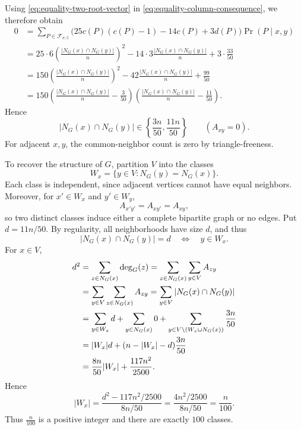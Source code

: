 Using \eqref{eq:equality-two-root-vector} in
\eqref{eq:equality-column-consequence}, we therefore obtain
\begin{align*}
0&=\sum_{P\in\mathcal F_{\sigma,5}}
\big(25c(P)(c(P)-1)-14c(P)+3d(P)\big)\Pr(P\mid x,y)\\
&=25\cdot6\left(\frac{|N_G(x)\cap N_G(y)|}{n}\right)^2-14\cdot3\frac{|N_G(x)\cap N_G(y)|}{n}+3\cdot\frac{33}{50}\\
 &=150\left(\frac{|N_G(x)\cap N_G(y)|}{n}\right)^2-42\frac{|N_G(x)\cap N_G(y)|}{n}+\frac{99}{50}\\
 &=150\left(\frac{|N_G(x)\cap N_G(y)|}{n}-\frac3{50}\right)
       \left(\frac{|N_G(x)\cap N_G(y)|}{n}-\frac{11}{50}\right).
\end{align*}
\endgroup
Hence
\begin{equation}\label{eq:equality-common-neighbors}
|N_G(x)\cap N_G(y)|\in
\left\{\frac{3n}{50},\frac{11n}{50}\right\}
\qquad(A_{xy}=0).
\end{equation}
For adjacent $x,y$, the common-neighbor count is zero by
triangle-freeness.

To recover the structure of $G$, partition $V$ into the classes
\[
W_x=\{y\in V:N_G(y)=N_G(x)\}.
\]
Each class is independent, since adjacent vertices cannot have equal
neighbors.
Moreover, for $x'\in W_x$ and $y'\in W_y$,
\[
A_{x'y'}=A_{xy'}=A_{xy},
\]
so two distinct classes induce either a complete bipartite graph or
no edges.
Put $d=11n/50$.
By regularity, all neighborhoods have size $d$, and thus
\[
|N_G(x)\cap N_G(y)|=d
\quad\Longleftrightarrow\quad y\in W_x.
\]
For $x\in V$,
\begin{align}
d^2
&=\sum_{z\in N_G(x)}\deg_G(z)
 =\sum_{z\in N_G(x)}\sum_{y\in V}A_{zy}\notag\\
&=\sum_{y\in V}\sum_{z\in N_G(x)}A_{zy}
 =\sum_{y\in V}|N_G(x)\cap N_G(y)|\notag\\
&=\sum_{y\in W_x}d+\sum_{y\in N_G(x)}0
 +\sum_{y\in V\setminus(W_x\cup N_G(x))}\frac{3n}{50}\notag\\
&=|W_x|d+(n-|W_x|-d)\frac{3n}{50}\notag\\
&=\frac{8n}{50}|W_x|+\frac{117n^2}{2500}.
\label{eq:equality-common-neighbor-total}
\end{align}
Hence
\begin{equation}\label{eq:equality-class-size}
|W_x|=\frac{d^2-117n^2/2500}{8n/50}
=\frac{4n^2/2500}{8n/50}=\frac n{100}.
\end{equation}
Thus $\frac n{100}$ is a positive integer and there are exactly $100$ classes.


